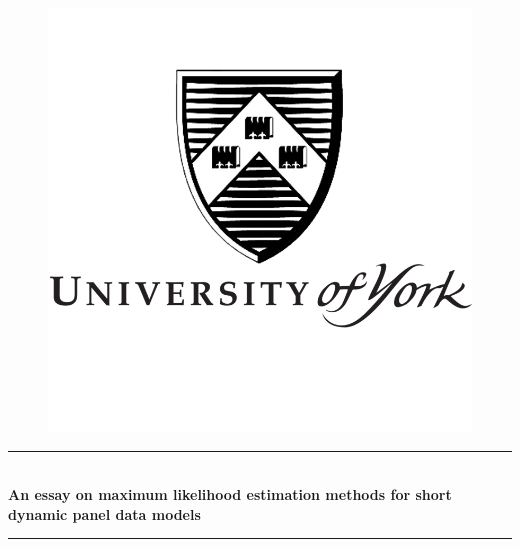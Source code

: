 \documentclass[12pt,a4paper,hyperref]{article}
\begin{document}
\begin{titlepage}

\newcommand{\HRule}{\rule{\linewidth}{0.5mm}} %

\center %

\begin{figure}
\centering
\includegraphics[scale=0.3]{universityofyork.png}
\end{figure}



\HRule \\[0.4cm]
{ \huge \bfseries An essay on maximum likelihood estimation methods for short dynamic panel data models}\\[0.4cm] %
\HRule \\[1.5cm]


\end{titlepage}
\end{document}
